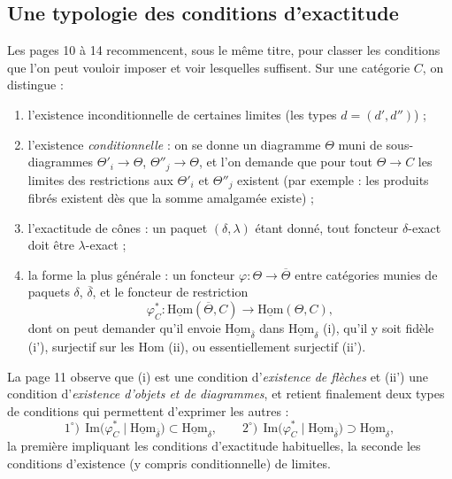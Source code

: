\documentclass[11pt,a4paper]{article}
\begin{document}
\subsection*{Une typologie des conditions d'exactitude}

Les pages 10 à 14 recommencent, sous le même titre, pour classer les
conditions que l'on peut vouloir imposer et voir lesquelles suffisent. Sur
une catégorie $C$, on distingue :
\begin{enumerate}
\item[a)] l'existence inconditionnelle de certaines limites (les types
$d = (d', d'')$) ;
\item[b)] l'existence \emph{conditionnelle} : on se donne un diagramme
$\Theta$ muni de sous-diagrammes $\Theta'_{i} \to \Theta$, $\Theta''_{j} \to
\Theta$, et l'on demande que pour tout $\Theta \to C$ les limites des
restrictions aux $\Theta'_{i}$ et $\Theta''_{j}$ existent (par exemple :
les produits fibrés existent dès que la somme amalgamée existe) ;
\item[c)] l'exactitude de cônes : un paquet $(\delta, \lambda)$ étant donné,
tout foncteur $\delta$-exact doit être $\lambda$-exact ;
\item[d)] la forme la plus générale : un foncteur $\varphi : \Theta \to
\overline{\Theta}$ entre catégories munies de paquets $\delta$,
$\overline{\delta}$, et le foncteur de restriction
\[
\varphi^{*}_{C} : \underline{\mathrm{Hom}}(\overline{\Theta}, C)
\longrightarrow \underline{\mathrm{Hom}}(\Theta, C),
\]
dont on peut demander qu'il envoie $\underline{\mathrm{Hom}}_{\overline
{\delta}}$ dans $\underline{\mathrm{Hom}}_{\delta}$ (i), qu'il y soit fidèle
(i'), surjectif sur les Hom (ii), ou essentiellement surjectif (ii').
\end{enumerate}
La page 11 observe que (i) est une condition d'\emph{existence de flèches}
et (ii') une condition d'\emph{existence d'objets et de diagrammes}, et
retient finalement deux types de conditions qui permettent d'exprimer les
autres :
\[
1^{\circ})\ \ \mathrm{Im}\bigl(\varphi^{*}_{C} \mid
\underline{\mathrm{Hom}}_{\overline{\delta}}\bigr) \subset
\underline{\mathrm{Hom}}_{\delta}, \qquad
2^{\circ})\ \ \mathrm{Im}\bigl(\varphi^{*}_{C} \mid
\underline{\mathrm{Hom}}_{\overline{\delta}}\bigr) \supset
\underline{\mathrm{Hom}}_{\delta},
\]
la première impliquant les conditions d'exactitude habituelles, la seconde
les conditions d'existence (y compris conditionnelle) de limites.
\end{document}

